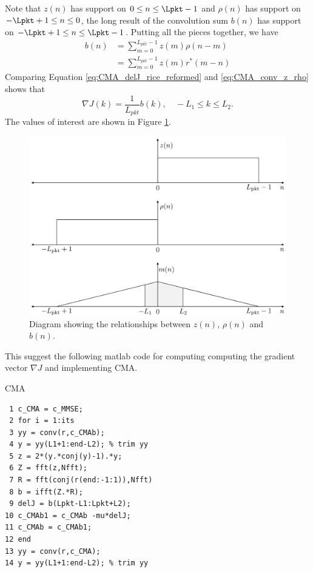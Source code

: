 Note that $z(n)$ has support on $0 \leq n \leq \Lpkt-1$ and 
$\rho(n)$ has support on $-\Lpkt+1 \leq n \leq 0$, 
the long result of the convolution sum $b(n)$ has support on $-\Lpkt+1 \leq n \leq \Lpkt-1$.
Putting all the pieces together, we have
\begin{align}
b(n) &= \sum^{L_{pkt}-1}_{m=0} z(m) \rho(n-m) \nonumber \\
	 &= \sum^{L_{pkt}-1}_{m=0} z(m) r^\ast(m-n)
	 \label{eq:CMA_conv_z_rho}
\end{align}
Comparing Equation \eqref{eq:CMA_delJ_rice_reformed} and \eqref{eq:CMA_conv_z_rho} shows that 
\begin{equation}
\nabla J(k) = \frac{1}{L_{pkt}} b(k), \quad -L_1 \leq k \leq L_2.
\label{eq:CMA_delJ_donzo}
\end{equation}
The values of interest are shown in Figure \ref{fig:convolutionFigureRice}.
\begin{figure}
	\centering\includegraphics[width=10in/100*55]{figures/eq_equations/convolutionFigureRice.pdf}
	\caption{Diagram showing the relationships between $z(n)$, $\rho(n)$ and $b(n)$.}
	\label{fig:convolutionFigureRice}
\end{figure}

This suggest the following matlab code for computing computing the gradient vector $\nabla J$ and implementing CMA.
\begin{table}[h]
\caption{CMA}
\label{code:CMA}
\singlespacing
{\footnotesize
\begin{verbatim}
 1 c_CMA = c_MMSE;
 2 for i = 1:its
 3 yy = conv(r,c_CMAb);
 4 y = yy(L1+1:end-L2); % trim yy
 5 z = 2*(y.*conj(y)-1).*y;
 6 Z = fft(z,Nfft);
 7 R = fft(conj(r(end:-1:1)),Nfft)
 8 b = ifft(Z.*R);
 9 delJ = b(Lpkt-L1:Lpkt+L2);
10 c_CMAb1 = c_CMAb -mu*delJ;
11 c_CMAb = c_CMAb1;
12 end
13 yy = conv(r,c_CMA);
14 y = yy(L1+1:end-L2); % trim yy
\end{verbatim}
}
\end{table}
\doublespacing


